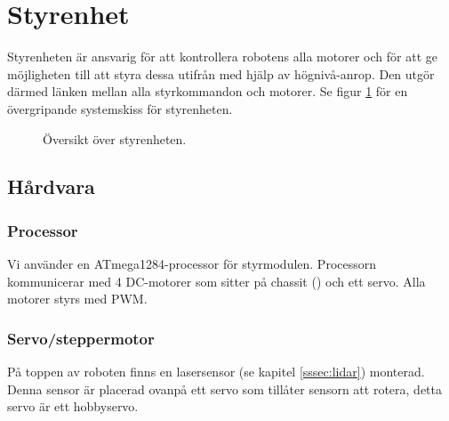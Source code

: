 \documentclass[a4paper,11pt]{article}
\begin{document}
\clearpage
\section{Styrenhet} \label{sec:system2}
Styrenheten är ansvarig för att kontrollera robotens alla motorer och för att ge möjligheten till att styra dessa utifrån med hjälp av högnivå-anrop. Den utgör därmed länken mellan alla styrkommandon och motorer. Se figur \ref{fig:unitMotorcontroller} för en övergripande systemskiss för styrenheten.

\begin{figure}[h!]
    \caption{Översikt över styrenheten.}
    \label{fig:unitMotorcontroller}
\end{figure}

\subsection{Hårdvara}

\subsubsection{Processor}
Vi använder en ATmega1284-processor för styrmodulen. Processorn kommunicerar med 4 DC-motorer som sitter på chassit (\cite{terminator}) och ett servo. Alla motorer styrs med PWM.

\clearpage

\subsubsection{Servo/steppermotor} \label{ssec:servomotor}
På toppen av roboten finns en lasersensor (se kapitel \ref{sssec:lidar}) monterad. Denna sensor är placerad ovanpå ett servo som tillåter sensorn att rotera, detta servo är ett hobbyservo.
\end{document}
